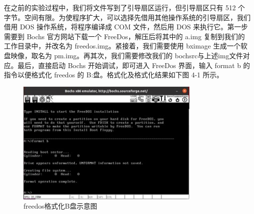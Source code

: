 在之前的实验过程中，我们将文件写到了引导扇区运行，但引导扇区只有 512 个字节。空间有限。为使程序扩大，可以选择先借用其他操作系统的引导扇区，我们借用 DOS 操作系统，将程序编译成 COM 文件，然后用 DOS 来执行它。第一步需要到 Bochs 官方网站下载一个 FreeDos，解压后将其中的 a.img 复制到我们的工作目录中，并改名为 freedos.img。紧接着，我们需要使用 bximage 生成一个软盘映像，取名为 pm.img。再其次，我们需要修改我们的 bochsrc与上述img文件对应。最后，直接启动 Bochs 开始调试，即可进入 FreeDos 界面，输入 format b 的指令以便格式化 freedos 的 B:盘。格式化及格式化结果如下图 4-1 所示。
\begin{figure}[H]
  \centering
  \includegraphics[width=0.8\textwidth]{figures/chapter4/4-1.jpg}
  \caption{freedos格式化B盘示意图}
  \label{fig:1}
\end{figure}

